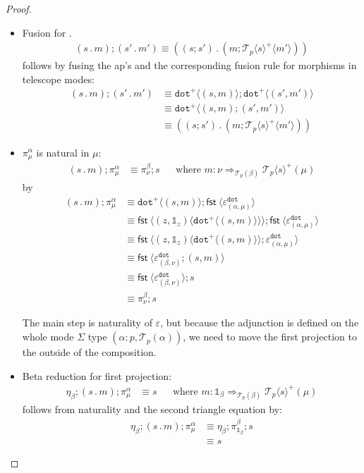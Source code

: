 \documentclass[10pt]{article}
\theoremstyle{definition}
\newcommand\dsd[1]{\ensuremath{\mathsf{#1}}}
\newcommand{\tcell}{\Rightarrow}
\newcommand{\app}[2]{\ensuremath{#1 \: #2}}
\newcommand{\sigmacl}[3]{\ensuremath{(#1{:}#2,#3)}}
\newcommand{\fst}[1]{\app{\dsd{fst}}{#1}}
\newcommand\TrPlus[2]{\ensuremath{{#1}^+(#2)}}
\newcommand\El[2]{\mathcal{T}_{#1}(#2)}
\newcommand\ApEl[2]{\mathcal{T}_{#1}\langle#2\rangle}
\newcommand\bdot[0]{\mathbin{.}}
\newcommand\ap[2]{\ensuremath{#1 \langle #2 \rangle }}
\newcommand\ApPlus[2]{\ensuremath{{#1}^+ \langle #2 \rangle }}
\newcommand{\tdot}{\ensuremath{\mathtt{dot}}}
\newcommand\One{\ensuremath{\mathds{1}}}
\begin{document}
\begin{proof}
\begin{itemize}
\item Fusion for $.$
\begin{align}
\label{dot-fusion}
    (s \bdot m);(s' \bdot m') \equiv ((s;s') \bdot (m;\ApPlus{\ApEl{p}{s}} {m'}))
\end{align}
follows by fusing the ap's and the corresponding fusion rule for morphisms in telescope modes:
\begin{align*}
(s \bdot m);(s' \bdot m') &\equiv \ApPlus{\tdot}{(s, m)} ; \ApPlus{\tdot}{(s', m')} \\
&\equiv \ApPlus{\tdot}{(s, m);(s', m')} \\
&\equiv ((s;s') \bdot (m;\ApPlus{\ApEl{p}{s}} {m'}))
\end{align*}

\item $\pi^\alpha_\mu$ is natural in $\mu$:
  \begin{align}
  \label{pi-naturality}
  (s \bdot m); \pi^\alpha_\mu &\equiv \pi^\beta_\nu;s && \text{where }
  {m} : {\nu} \tcell_{\El{p}{\beta}} {\TrPlus{\ApEl{p}{s}}{\mu}}
  \end{align}
  by
  \begin{align*}
  (s \bdot m); \pi^\alpha_\mu 
  &\equiv \ApPlus{\tdot}{(s, m)} ; \ap \fst {\varepsilon^\tdot_{(\alpha, \mu)}} \\  
  &\equiv \ap{\fst}{\ap{(z,\One_z)}{\ApPlus{\tdot}{(s, m)}}} ; \ap \fst {\varepsilon^\tdot_{(\alpha, \mu)}} \\
  &\equiv \ap{\fst}{\ap{(z,\One_z)}{\ApPlus{\tdot}{(s, m)}} ; \varepsilon^\tdot_{(\alpha, \mu)}}  \\
  &\equiv \ap{\fst}{\varepsilon^\tdot_{(\beta, \nu)}; (s, m) } \\
  &\equiv \ap{\fst}{\varepsilon^\tdot_{(\beta, \nu)}} ; s\\
  &\equiv \pi^\beta_\nu ; s
  \end{align*}

The main step is naturality of $\varepsilon$, but because the adjunction
is defined on the whole mode $\Sigma$ type \sigmacl{\alpha}{p}{\El p
  \alpha}, we need to move the first projection to the outside of the
composition.
  
\item Beta reduction for first projection:
  \begin{align}
\label{beta-pi}
\eta_\beta;(s \bdot m);\pi^\alpha_\mu &\equiv s && \text{where } {m} : {\One_\beta} \tcell_{\El p \beta} {\TrPlus{\ApEl{p}{s}}{\mu}}
  \end{align}
follows from naturality and the second triangle equation by:
\begin{align*}
\eta_\beta;(s \bdot m);\pi^\alpha_\mu
&\equiv \eta_\beta;\pi^\beta_{\One_\beta};s \\
&\equiv s
\end{align*}


\end{itemize}
\end{proof}
\end{document}
